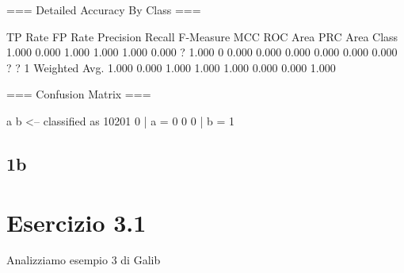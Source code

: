 \documentclass{report}
\begin{document}
	=== Detailed Accuracy By Class ===
	
	TP Rate  FP Rate  Precision  Recall   F-Measure  MCC      ROC Area  PRC Area  Class
	1.000    0.000    1.000      1.000    1.000      0.000    ?         1.000     0
	0.000    0.000    0.000      0.000    0.000      0.000    ?         ?         1
	Weighted Avg.    1.000    0.000    1.000      1.000    1.000      0.000    0.000     1.000     
	
	=== Confusion Matrix ===
	
	a     b   <-- classified as
	10201     0 |     a = 0
	0     0 |     b = 1
	
	\chapter{1b}
	
	\part{Esercizio 3.1}
	Analizziamo esempio 3 di Galib
	
\end{document}
